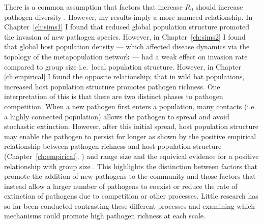 There is a common assumption that factors that increase $R_0$ should increase pathogen diversity \cite{nunn2003comparative, morand2000wormy}.
However, my results imply a more nuanced relationship. 
In Chapter~\ref{ch:sims1} I found that reduced global population structure promoted the invasion of new pathogen species.
However, in Chapter~\ref{ch:sims2} I found that global host population density ---  which affected disease dynamics via the topology of the metapopulation network --- had a weak effect on invasion rate compared to group size i.e.\ local population structure.
However, in Chapter \ref{ch:empirical} I found the opposite relationship; that in wild bat populations, increased host population structure promotes pathogen richness.
One interpretation of this is that there are two distinct phases to pathogen competition.
When a new pathogen first enters a population, many contacts (i.e. a highly connected population) allows the pathogen to spread and avoid stochastic extinction.
However, after this initial spread, host population structure may enable the pathogen to persist for longer as shown by the positive empirical relationship between pathogen richness and host population structure (Chapter~\ref{ch:empirical}, \textcite{turmelle2009correlates, maganga2014bat}) and range size \cite{kamiya2014determines, nunn2003comparative} and the equivical evidence for a positive relationship with group size \cite{rifkin2012animals, ezenwa2006host}.
This highlights the distinction between factors that promote the addition of new pathogens to the community and those factors that instead allow a larger number of pathogens to coexist or reduce the rate of extinction of pathogens due to competition or other processes.
Little research has so far been conducted contrasting these different processes and examining which mechanisms could promote high pathogen richness at each scale.






